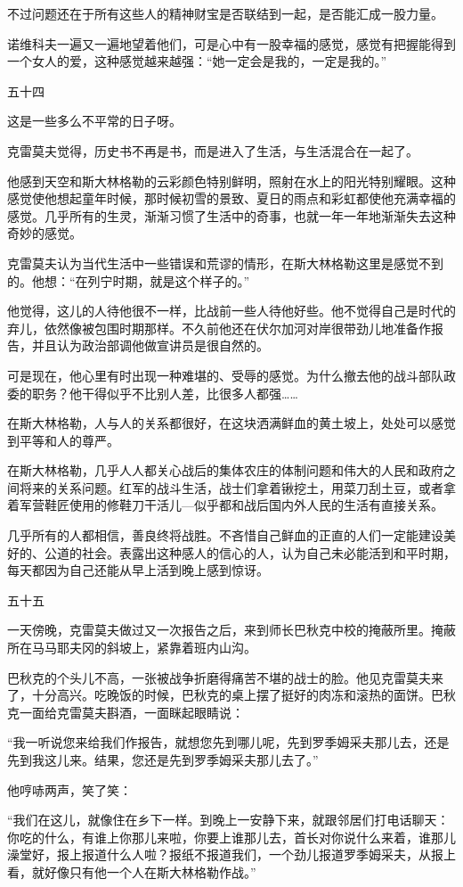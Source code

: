 不过问题还在于所有这些人的精神财宝是否联结到一起，是否能汇成一股力量。

诺维科夫一遍又一遍地望着他们，可是心中有一股幸福的感觉，感觉有把握能得到一个女人的爱，这种感觉越来越强：“她一定会是我的，一定是我的。”

五十四

这是一些多么不平常的日子呀。

克雷莫夫觉得，历史书不再是书，而是进入了生活，与生活混合在一起了。

他感到天空和斯大林格勒的云彩颜色特别鲜明，照射在水上的阳光特别耀眼。这种感觉使他想起童年时候，那时候初雪的景致、夏日的雨点和彩虹都使他充满幸福的感觉。几乎所有的生灵，渐渐习惯了生活中的奇事，也就一年一年地渐渐失去这种奇妙的感觉。

克雷莫夫认为当代生活中一些错误和荒谬的情形，在斯大林格勒这里是感觉不到的。他想：“在列宁时期，就是这个样子的。”

他觉得，这儿的人待他很不一样，比战前一些人待他好些。他不觉得自己是时代的弃儿，依然像被包围时期那样。不久前他还在伏尔加河对岸很带劲儿地准备作报告，并且认为政治部调他做宣讲员是很自然的。

可是现在，他心里有时出现一种难堪的、受辱的感觉。为什么撤去他的战斗部队政委的职务？他干得似乎不比别人差，比很多人都强……

在斯大林格勒，人与人的关系都很好，在这块洒满鲜血的黄土坡上，处处可以感觉到平等和人的尊严。

在斯大林格勒，几乎人人都关心战后的集体农庄的体制问题和伟大的人民和政府之间将来的关系问题。红军的战斗生活，战士们拿着锹挖土，用菜刀刮土豆，或者拿着军营鞋匠使用的修鞋刀干活儿—似乎都和战后国内外人民的生活有直接关系。

几乎所有的人都相信，善良终将战胜。不吝惜自己鲜血的正直的人们一定能建设美好的、公道的社会。表露出这种感人的信心的人，认为自己未必能活到和平时期，每天都因为自己还能从早上活到晚上感到惊讶。

五十五

一天傍晚，克雷莫夫做过又一次报告之后，来到师长巴秋克中校的掩蔽所里。掩蔽所在马马耶夫冈的斜坡上，紧靠着班内山沟。

巴秋克的个头儿不高，一张被战争折磨得痛苦不堪的战士的脸。他见克雷莫夫来了，十分高兴。吃晚饭的时候，巴秋克的桌上摆了挺好的肉冻和滚热的面饼。巴秋克一面给克雷莫夫斟酒，一面眯起眼睛说：

“我一听说您来给我们作报告，就想您先到哪儿呢，先到罗季姆采夫那儿去，还是先到我这儿来。结果，您还是先到罗季姆采夫那儿去了。”

他哼哧两声，笑了笑：

“我们在这儿，就像住在乡下一样。到晚上一安静下来，就跟邻居们打电话聊天：你吃的什么，有谁上你那儿来啦，你要上谁那儿去，首长对你说什么来着，谁那儿澡堂好，报上报道什么人啦？报纸不报道我们，一个劲儿报道罗季姆采夫，从报上看，就好像只有他一个人在斯大林格勒作战。”

